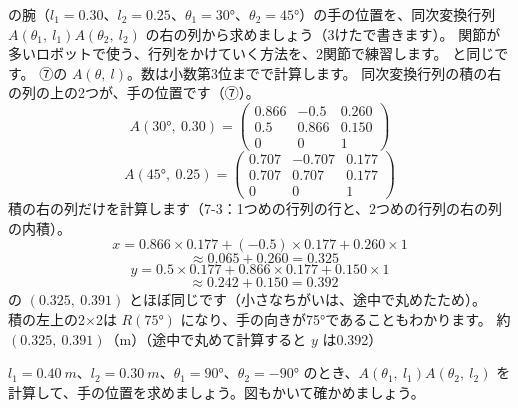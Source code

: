 \begin{phreidai}[同次変換行列のかけ算で手の位置]\label{ph:力-7:ex7}
の腕（$l_1=0.30$、$l_2=0.25$、$\theta_1=\ang{30}$、$\theta_2=\ang{45}$）の手の位置を、同次変換行列 $A(\theta_1,\ l_1)A(\theta_2,\ l_2)$ の右の列から求めましょう（3けたで書きます）。
\phbamen
関節が多いロボットで使う、行列をかけていく方法を、2関節で練習します。
\phmushi
{}と同じです。
\phzu
⑦の $A(\theta,\ l)$。数は小数第3位までで計算します。
\phriyu
同次変換行列の積の右の列の上の2つが、手の位置です（⑦）。
\phtateru
\[A(\ang{30},\ 0.30)=\begin{pmatrix}0.866&-0.5&0.260\\0.5&0.866&0.150\\0&0&1\end{pmatrix}\]
\[A(\ang{45},\ 0.25)=\begin{pmatrix}0.707&-0.707&0.177\\0.707&0.707&0.177\\0&0&1\end{pmatrix}\]
\phtoku
積の右の列だけを計算します（7-3：1つめの行列の行と、2つめの行列の右の列の内積）。
\[x=0.866\times0.177+(-0.5)\times0.177+0.260\times1\]
\[\phantom{x}\approx0.065+0.260=0.325\]
\[y=0.5\times0.177+0.866\times0.177+0.150\times1\]
\[\phantom{y}\approx0.242+0.150=0.392\]
\phtashikame
{}の $(0.325,\ 0.391)$ とほぼ同じです（小さなちがいは、途中で丸めたため）。\\
積の左上の2×2は $R(\ang{75})$ になり、手の向きが\ang{75}であることもわかります。
\kotae 約 $(0.325,\ 0.391)$（m）（途中で丸めて計算すると $y$ は0.392）
\end{phreidai}
\begin{jibun}
$l_1=\qty{0.40}{m}$、$l_2=\qty{0.30}{m}$、$\theta_1=\ang{90}$、$\theta_2=\ang{-90}$ のとき、$A(\theta_1,\ l_1)A(\theta_2,\ l_2)$ を計算して、手の位置を求めましょう。図もかいて確かめましょう。
\end{jibun}

